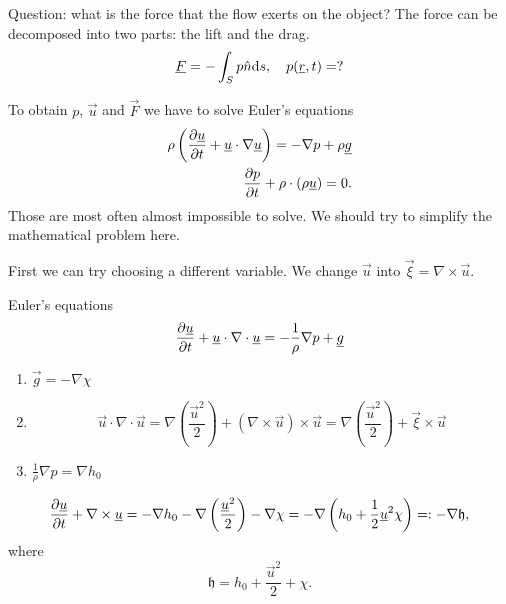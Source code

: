 \documentclass[../main.tex]{subfiles}
\begin{document}
    Question: what is the force that the flow exerts on the object?
    The force can be decomposed into two parts: the lift and the drag.
    \begin{displaymath}
      \underline{F} = -\int_S p \hat{n} \mathrm{d} s, \quad p(\underline{r}, t) = ?
    \end{displaymath}

    To obtain $p$, $\vec u$ and $\vec F$ we have to solve Euler's equations
    \begin{align*}
      \rho\left( \frac{\partial \underline{u}}{\partial t} + \underline{u} \cdot \nabla \underline{u} \right) = - \nabla p + \rho \underline{g}\\
      \frac{\partial p}{\partial t} + \rho \cdot (\rho \underline{u}) = 0.
    \end{align*}
    Those are most often almost impossible to solve.
    We should try to simplify the mathematical problem here.

    First we can try choosing a different variable.
    We change $\vec u$ into  $\vec \xi = \nabla \times \vec u$.
    
    \begin{figure}
      \centering
      \label{fig:}
    \end{figure}

    Euler's equations
    \begin{displaymath}
      \frac{\partial \underline{u}}{\partial t}+ \underline{u} \cdot \nabla \cdot \underline{u}= - \frac{1}{\rho} \nabla p + \underline{g}
    \end{displaymath}
    \begin{enumerate}
      \item $ \vec g = - \nabla \chi$
      \item 
        \begin{displaymath}
          \vec u \cdot \nabla \cdot \vec u = \nabla \left( \frac{\vec u^2}{2} \right) + (\nabla \times \vec u) \times \vec u 
          = \nabla \left( \frac{\vec u^2}{2} \right) + \vec \xi \times \vec u
        \end{displaymath}
      \item $ \frac{1}{\rho} \nabla p = \nabla h_0$
    \end{enumerate}
    \begin{equation}
      \frac{\partial \underline{u}}{\partial t} + \nabla \times \underline{u} = - \nabla h_0 - \nabla \left( \frac{\underline{u}^2}{2} \right) - \nabla \chi
      = - \nabla \left( h_0 + \frac{1}{2} \underline{u}^2 \chi \right) =: - \nabla  \mathfrak{h},
      \label{eq:3.4}
    \end{equation}
    where
    \begin{displaymath}
      \mathfrak{h} = h_0 + \frac{ \vec u^2}{2} + \chi .
    \end{displaymath}
\end{document}
